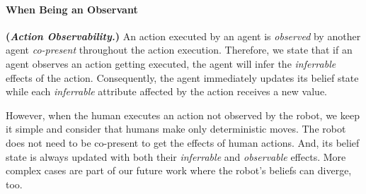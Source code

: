 \documentclass[letterpaper]{article} %
\begin{document}
\paragraph{When Being an Observant} \textbf{(\textit{Action Observability.})}
An action executed by an agent is \textit{observed} by another agent \emph{co-present} throughout the action execution. Therefore, we state that if an agent observes an action getting executed, the agent will infer the \textit{inferrable} effects of the action.
Consequently, the agent immediately updates its belief state while each \textit{inferrable} attribute affected by the action receives a new value.  



However, when the human executes an action not observed by the robot, we keep it simple and consider that humans make only deterministic moves. The robot does not need to be co-present to get the effects of human actions. And, its belief state is always updated with both their \textit{inferrable} and \textit{observable} effects. More complex cases are part of our future work where the robot's beliefs can diverge, too. 
\end{document}
